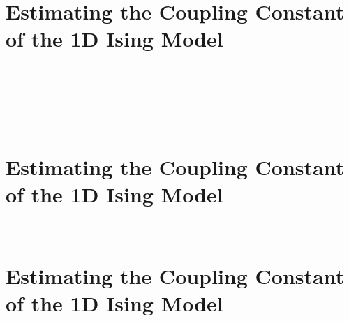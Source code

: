\documentclass[11pt]{article}
\begin{document}
    \begin{center}
    \end{center}
    { \hspace*{\fill} \\}
    
\newpage
\hypertarget{estimating-the-coupling-constant-of-the-1d-ising-model}{%
\section*{Estimating the Coupling Constant of the 1D Ising
Model}\label{estimating-the-coupling-constant-of-the-1d-ising-model5}}
    \begin{center}
    \end{center}
    { \hspace*{\fill} \\}
    
    \begin{center}
    \end{center}
    { \hspace*{\fill} \\}
    
    \begin{center}
    \end{center}
    { \hspace*{\fill} \\}
    
\newpage
\hypertarget{estimating-the-coupling-constant-of-the-1d-ising-model}{%
\section*{Estimating the Coupling Constant of the 1D Ising
Model}\label{estimating-the-coupling-constant-of-the-1d-ising-model6}}
    \begin{center}
    \end{center}
    { \hspace*{\fill} \\}

\newpage
\hypertarget{estimating-the-coupling-constant-of-the-1d-ising-model}{%
\section*{Estimating the Coupling Constant of the 1D Ising
Model}\label{estimating-the-coupling-constant-of-the-1d-ising-model7}}
    \begin{center}
    \end{center}
    { \hspace*{\fill} \\}
\end{document}
